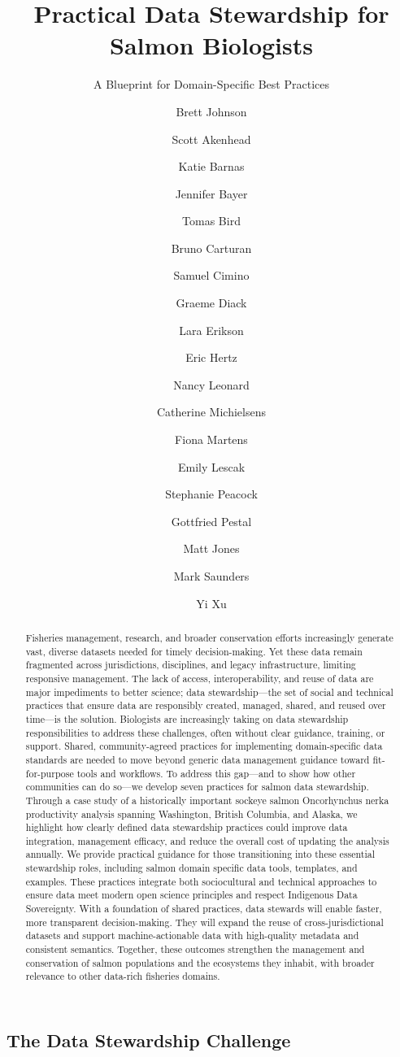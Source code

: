 \documentclass[
  letterpaper,
  DIV=11,
  numbers=noendperiod]{scrartcl}
\title{Practical Data Stewardship for Salmon Biologists}
\subtitle{A Blueprint for Domain-Specific Best Practices}
\author{Brett Johnson \and Scott Akenhead \and Katie
Barnas \and Jennifer Bayer \and Tomas Bird \and Bruno
Carturan \and Samuel Cimino \and Graeme Diack \and Lara
Erikson \and Eric Hertz \and Nancy Leonard \and Catherine
Michielsens \and Fiona Martens \and Emily Lescak \and Stephanie
Peacock \and Gottfried Pestal \and Matt Jones \and Mark Saunders \and Yi
Xu}
\date{}
\begin{document}
\maketitle
\begin{abstract}
Fisheries management, research, and broader conservation efforts
increasingly generate vast, diverse datasets needed for timely
decision-making. Yet these data remain fragmented across jurisdictions,
disciplines, and legacy infrastructure, limiting responsive management.
The lack of access, interoperability, and reuse of data are major
impediments to better science; data stewardship---the set of social and
technical practices that ensure data are responsibly created, managed,
shared, and reused over time---is the solution. Biologists are
increasingly taking on data stewardship responsibilities to address
these challenges, often without clear guidance, training, or support.
Shared, community-agreed practices for implementing domain-specific data
standards are needed to move beyond generic data management guidance
toward fit-for-purpose tools and workflows. To address this gap---and to
show how other communities can do so---we develop seven practices for
salmon data stewardship. Through a case study of a historically
important sockeye salmon Oncorhynchus nerka productivity analysis
spanning Washington, British Columbia, and Alaska, we highlight how
clearly defined data stewardship practices could improve data
integration, management efficacy, and reduce the overall cost of
updating the analysis annually. We provide practical guidance for those
transitioning into these essential stewardship roles, including salmon
domain specific data tools, templates, and examples. These practices
integrate both sociocultural and technical approaches to ensure data
meet modern open science principles and respect Indigenous Data
Sovereignty. With a foundation of shared practices, data stewards will
enable faster, more transparent decision-making. They will expand the
reuse of cross-jurisdictional datasets and support machine-actionable
data with high-quality metadata and consistent semantics. Together,
these outcomes strengthen the management and conservation of salmon
populations and the ecosystems they inhabit, with broader relevance to
other data-rich fisheries domains.
\end{abstract}


\subsection{The Data Stewardship
Challenge}\label{the-data-stewardship-challenge}
\end{document}
